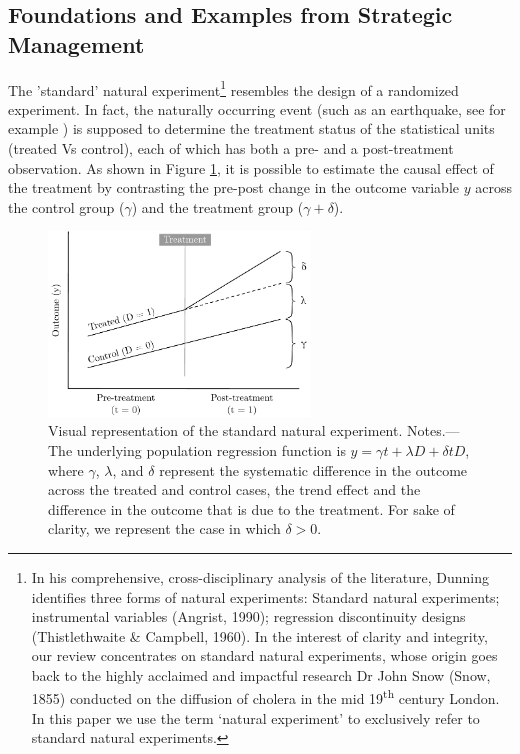 \documentclass[11pt, english]{article}
\begin{document}
\subsection{Foundations and Examples from Strategic Management}
\label{sub:foundations_examples}

\noindent The 'standard' natural experiment\footnote{In his comprehensive,
    cross-disciplinary analysis of the literature, Dunning
    \citeyear[][]{Dunning2012} identifies
    three forms of natural experiments: Standard natural experiments;
    instrumental variables (Angrist, 1990); regression discontinuity designs
    (Thistlethwaite \& Campbell, 1960). In the interest of clarity and
    integrity, our review concentrates on standard natural experiments, whose
    origin goes back to the highly acclaimed and impactful research Dr John Snow
    (Snow, 1855) conducted on the diffusion of cholera in the mid
19\textsuperscript{th} century London. In this paper we use the term `natural
experiment' to exclusively refer to standard natural experiments.} resembles the
design of a randomized experiment. In fact, the naturally occurring event (such
as an earthquake, see for example \cite[][]{Belloc2016}) is supposed
to determine the treatment status of the statistical units (treated Vs control),
each of which has both a pre- and a post-treatment observation. As shown in
Figure \ref{fig:ne_logic_viz}, it is possible to estimate the causal effect of the treatment by
contrasting the pre-post change in the outcome variable $y$ across
the control group ($\gamma$) and the treatment group 
($ \gamma + \delta$).

\begin{figure}[]
    \centering
    \includegraphics[width=0.62\textwidth]{images/ne_logic_viz.pdf}
    \caption{Visual representation of the standard natural experiment. Notes.---
        The underlying population regression function is $y = \gamma t +
        \lambda D + \delta t D$, where $\gamma$, $\lambda$, and $\delta$ represent 
        the systematic difference in the outcome across the treated and control 
        cases, the trend effect and the difference in the outcome that is due to
        the treatment. For sake of clarity, we represent the case in which
        $\delta > 0$.}
    \label{fig:ne_logic_viz}
\end{figure}
\end{document}
